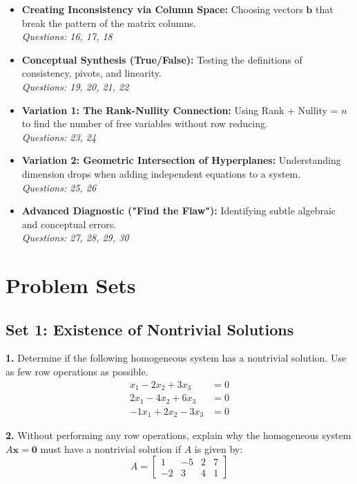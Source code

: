 \documentclass[12pt]{article}
\begin{document}
\begin{itemize}
    \item \textbf{Creating Inconsistency via Column Space:} Choosing vectors $\mathbf{b}$ that break the pattern of the matrix columns. \\ \textit{Questions: 16, 17, 18}
    \item \textbf{Conceptual Synthesis (True/False):} Testing the definitions of consistency, pivots, and linearity. \\ \textit{Questions: 19, 20, 21, 22}
    \item \textbf{Variation 1: The Rank-Nullity Connection:} Using Rank + Nullity = $n$ to find the number of free variables without row reducing. \\ \textit{Questions: 23, 24}
    \item \textbf{Variation 2: Geometric Intersection of Hyperplanes:} Understanding dimension drops when adding independent equations to a system. \\ \textit{Questions: 25, 26}
    \item \textbf{Advanced Diagnostic ("Find the Flaw"):} Identifying subtle algebraic and conceptual errors. \\ \textit{Questions: 27, 28, 29, 30}
\end{itemize}

\newpage

\section{Problem Sets}

\subsection*{Set 1: Existence of Nontrivial Solutions}
\textbf{1.} Determine if the following homogeneous system has a nontrivial solution. Use as few row operations as possible.
\begin{align*}
    x_1 - 2x_2 + 3x_3 &= 0 \\
    2x_1 - 4x_2 + 6x_3 &= 0 \\
    -1x_1 + 2x_2 - 3x_3 &= 0
\end{align*}

\textbf{2.} Without performing any row operations, explain why the homogeneous system $A\mathbf{x} = \mathbf{0}$ must have a nontrivial solution if $A$ is given by:
$$A = \begin{bmatrix} 1 & -5 & 2 & 7 \\ -2 & 3 & 4 & 1 \end{bmatrix}$$
\end{document}
